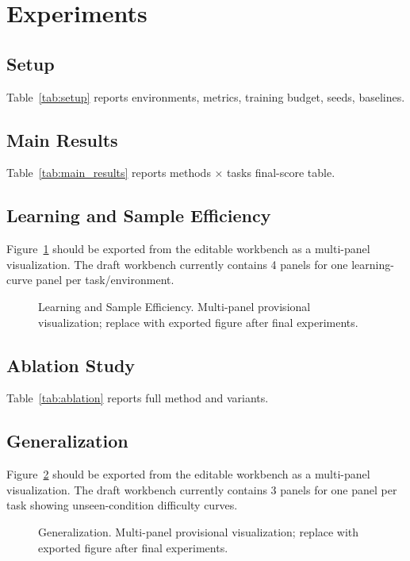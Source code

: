 \section{Experiments}

\subsection{Setup}
Table~\ref{tab:setup} reports environments, metrics, training budget, seeds, baselines.


\subsection{Main Results}
Table~\ref{tab:main_results} reports methods × tasks final-score table.


\subsection{Learning and Sample Efficiency}
Figure~\ref{fig:learning_efficiency} should be exported from the editable workbench as a multi-panel visualization. The draft workbench currently contains 4 panels for one learning-curve panel per task/environment.
\begin{figure}[t]
\centering
{}
\caption{Learning and Sample Efficiency. Multi-panel provisional visualization; replace with exported figure after final experiments.}
\label{fig:learning_efficiency}
\end{figure}

\subsection{Ablation Study}
Table~\ref{tab:ablation} reports full method and variants.


\subsection{Generalization}
Figure~\ref{fig:generalization} should be exported from the editable workbench as a multi-panel visualization. The draft workbench currently contains 3 panels for one panel per task showing unseen-condition difficulty curves.
\begin{figure}[t]
\centering
{}
\caption{Generalization. Multi-panel provisional visualization; replace with exported figure after final experiments.}
\label{fig:generalization}
\end{figure}

